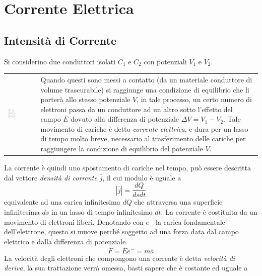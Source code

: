 \documentclass[10pt, letterpaper]{report}
\begin{document}
\chapter{Corrente Elettrica}
\section{Intensità di Corrente}
Si considerino due conduttori isolati $C_1$ e $C_2$ con potenziali $V_1$ e $V_2$. 
\begin{center}
	\begin{tabular}{>{\centering\arraybackslash}m{3in}>{\centering\arraybackslash}m{3in}}
		\includegraphics[width=0.3\textwidth]{images/corrente.eps} &   
		Quando questi sono messi a contatto (da un materiale conduttore di volume trascurabile) si raggiunge una condizione di equilibrio che li porterà allo stesso potenziale $V$, in tale processo, un certo numero di elettroni passa da un conduttore ad un altro sotto l'effetto del campo $\bar E$ dovuto alla differenza di potenziale $\Delta V=V_1-V_2$. 
Tale movimento di cariche è detto \textit{corrente elettrica}, e dura per un lasso di tempo molto breve, necessario al trasferimento delle cariche per raggiungere la condizione di equilibrio del potenziale $V$.
		\\
	\end{tabular}
\end{center}
La corrente è quindi uno spostamento di cariche nel tempo, può essere descritta dal vettore \textit{densità di corrente} $\bar j$, il cui modulo è uguale a 
$$ |\bar j|=\frac{dQ}{dsdt}$$
equivalente ad una carica infinitesima $dQ$ che attraversa una superficie infinitesima $ds$ in un lasso di tempo infinitesimo $dt$. La corrente è costituita da un movimento di elettroni liberi. Denotando con $e^-$ la carica fondamentale dell'elettrone, questo si muove perché soggetto ad una forza data dal campo elettrico e dalla differenza di potenziale. 
$$ \bar F = \bar Ee^-=m\bar a$$
La velocità degli elettroni che compongono una corrente è detta \textit{velocità di deriva}, la sua trattazione verrà omessa, basti sapere che è costante ed uguale a 
\end{document}
